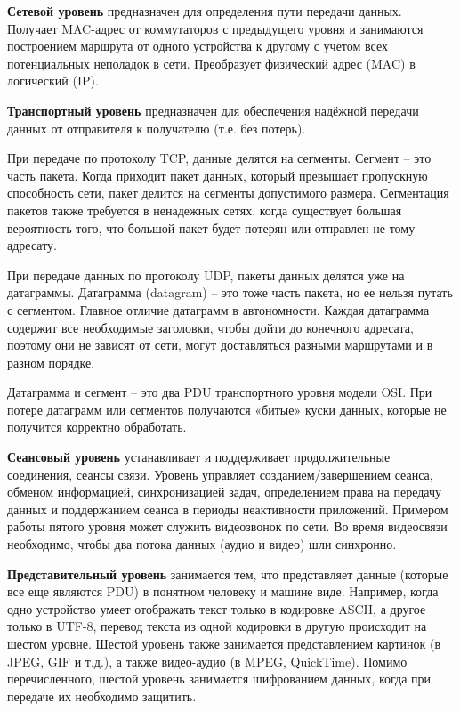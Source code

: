 \textbf{Сетевой уровень} предназначен для определения пути передачи данных. Получает MAC-адрес от коммутаторов с предыдущего уровня и занимаются построением маршрута от одного устройства к другому с учетом всех потенциальных неполадок в сети. Преобразует физический адрес (MAC) в логический (IP).

\textbf{Транспортный уровень} предназначен для обеспечения надёжной передачи данных от отправителя к получателю (т.е. без потерь).

При передаче по протоколу TCP, данные делятся на сегменты. Сегмент -- это часть пакета. Когда приходит пакет данных, который превышает пропускную способность сети, пакет делится на сегменты допустимого размера. Сегментация пакетов также требуется в ненадежных сетях, когда существует большая вероятность того, что большой пакет будет потерян или отправлен не тому адресату.

При передаче данных по протоколу UDP, пакеты данных делятся уже на датаграммы. Датаграмма (datagram) -- это тоже часть пакета, но ее нельзя путать с сегментом. Главное отличие датаграмм в автономности. Каждая датаграмма содержит все необходимые заголовки, чтобы дойти до конечного адресата, поэтому они не зависят от сети, могут доставляться разными маршрутами и в разном порядке.

Датаграмма и сегмент -- это два PDU транспортного уровня модели OSI. При потере датаграмм или сегментов получаются «битые» куски данных, которые не получится корректно обработать.

\textbf{Сеансовый уровень} устанавливает и поддерживает продолжительные соединения, сеансы связи.
Уровень управляет созданием/завершением сеанса, обменом информацией, синхронизацией задач, определением права на передачу данных и поддержанием сеанса в периоды неактивности приложений.
Примером работы пятого уровня может служить видеозвонок по сети. Во время видеосвязи необходимо, чтобы два потока данных (аудио и видео) шли синхронно.

\textbf{Представительный уровень} занимается тем, что представляет данные (которые все еще являются PDU) в понятном человеку и машине виде. Например, когда одно устройство умеет отображать текст только в кодировке ASCII, а другое только в UTF-8, перевод текста из одной кодировки в другую происходит на шестом уровне.
Шестой уровень также занимается представлением картинок (в JPEG, GIF и т.д.), а также видео-аудио (в MPEG, QuickTime). Помимо перечисленного, шестой уровень занимается шифрованием данных, когда при передаче их необходимо защитить.

